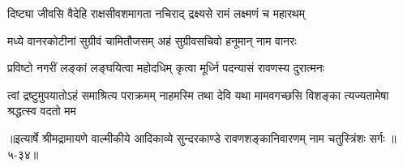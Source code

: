 \twolineshloka
{दिष्ट्या जीवसि वैदेहि राक्षसीवशमागता}
{नचिराद् द्रक्ष्यसे रामं लक्ष्मणं च महारथम्} %

\twolineshloka
{मध्ये वानरकोटीनां सुग्रीवं चामितौजसम्}
{अहं सुग्रीवसचिवो हनूमान् नाम वानरः} %

\twolineshloka
{प्रविष्टो नगरीं लङ्कां लङ्घयित्वा महोदधिम्}
{कृत्वा मूर्ध्नि पदन्यासं रावणस्य दुरात्मनः} %

\threelineshloka
{त्वां द्रष्टुमुपयातोऽहं समाश्रित्य पराक्रमम्}
{नाहमस्मि तथा देवि यथा मामवगच्छसि}
{विशङ्का त्यज्यतामेषा श्रद्धत्स्व वदतो मम} %


॥इत्यार्षे श्रीमद्रामायणे वाल्मीकीये आदिकाव्ये सुन्दरकाण्डे रावणशङ्कानिवारणम् नाम चतुस्त्रिंशः सर्गः ॥५-३४॥
